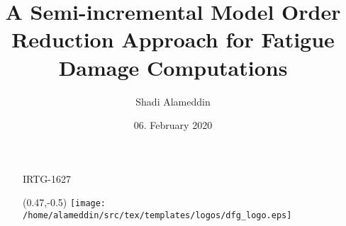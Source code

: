 \documentclass{beamer}
\title[A Semi-incremental MOR Approach for Fatigue Damage Computations]{A Semi-incremental Model Order Reduction Approach for Fatigue Damage Computations}
\author[S. Alameddin]{{Shadi Alameddin}}
\institute[IBNM - LUH]{IBNM, Leibniz Universit\"{a}t Hannover}
\date[\tddate \ \ \hhmm \tdtime]{06. February 2020\\[1cm]}
\begin{document}
\newcommand{\twocol}[3]{
\vspace*{-0.5cm}
\begin{columns}[t] %
	\begin{column}{.50\textwidth}
		#1
	\end{column}%
\vspace{-1cm}
	\begin{column}{.55\textwidth}
		#2
	\end{column}%
\end{columns}
#3
}
{
\centering
 \specialTitleDesign
 \begin{frame}
 \vspace*{0.2cm}
  \titlepage
\begin{figure}
	\begin{flushleft}
	\hspace*{0.58\linewidth} {\scriptsize IRTG-1627\\[0.2cm]}
		\hspace*{0.58\linewidth} \begin{picture}(0.47,-0.5)
		\texttt{[image: /home/alameddin/src/tex/templates/logos/dfg\_logo.eps]}
		\end{picture}
	\end{flushleft}
		\setlength{\unitlength}{\textwidth}
\end{figure}
\initclock
 \end{frame}
}



\captionsetup[figure]{labelformat=empty}%
\end{document}
